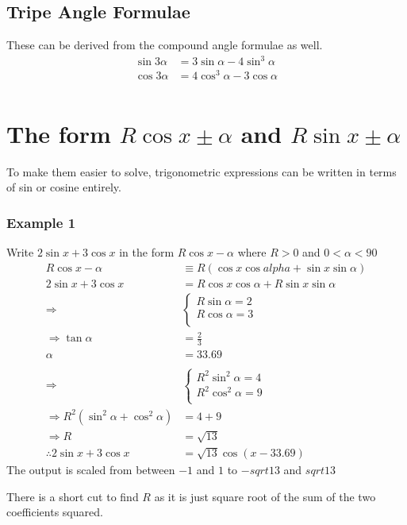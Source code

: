 \documentclass[a4paper,12pt]{article}
\begin{document}
\subsection*{Tripe Angle Formulae}
These can be derived from the compound angle formulae as well. 
\begin{align*}
\sin 3 \alpha & = 3 \sin \alpha - 4 \sin^3 \alpha \\
\cos 3 \alpha & = 4 \cos^3 \alpha - 3 \cos \alpha \\
\end{align*}
\section*{The form $R\cos x \pm \alpha$ and $R \sin x \pm \alpha$}
To make them easier to solve, trigonometric expressions can be written in terms of sin or cosine entirely. 
\subsubsection*{Example 1}
Write $2 \sin x + 3 \cos x$ in the form $R \cos x - \alpha$ where $R > 0$ and $0 < \alpha < 90$ \\
\begin{align*}
R \cos x - \alpha & \equiv R (\cos x \cos alpha + \sin x \sin \alpha) \\
2 \sin x + 3 \cos x & = R \cos x \cos \alpha + R \sin x \sin \alpha \\ 
\Rightarrow & \begin{cases}
	R \sin \alpha = 2 \\
	R \cos \alpha = 3 \\
	\end{cases} \\
\Rightarrow \tan \alpha & = \frac{2}{3} \\
\alpha & = 33.69 \\
\\
\Rightarrow & \begin{cases}
	R^2 \sin^2 \alpha = 4 \\
	R^2 \cos^2 \alpha = 9 \\
	\end{cases} \\
\Rightarrow R^2 (\sin^2 \alpha + \cos^2 \alpha) & = 4 + 9 \\
\Rightarrow R & = \sqrt{13} \\
\therefore 2 \sin x + 3 \cos x & = \sqrt{13}\cos(x-33.69)
\end{align*}
The output is scaled from between $-1$ and $1$ to $-sqrt{13}$ and $sqrt{13}$

There is a short cut to find $R$ as it is just square root of the sum of the two coefficients squared. 
\end{document}
